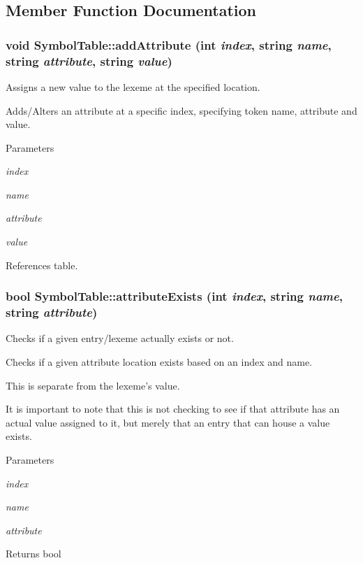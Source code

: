 \subsection{Member Function Documentation}
\hypertarget{classSymbolTable_ac7a86e820025627863b4277cf84353a0}{
\subsubsection[{addAttribute}]{\setlength{\rightskip}{0pt plus 5cm}void SymbolTable::addAttribute (int {\em index}, \/  string {\em name}, \/  string {\em attribute}, \/  string {\em value})}}
\label{classSymbolTable_ac7a86e820025627863b4277cf84353a0}


Assigns a new value to the lexeme at the specified location. 

Adds/Alters an attribute at a specific index, specifying token name, attribute and value.


\begin{DoxyParams}{Parameters}
\item[{\em index}]\item[{\em name}]\item[{\em attribute}]\item[{\em value}]\end{DoxyParams}


References table.

\hypertarget{classSymbolTable_af93b3c97308b5cfe7661e57b83d8dc35}{
\subsubsection[{attributeExists}]{\setlength{\rightskip}{0pt plus 5cm}bool SymbolTable::attributeExists (int {\em index}, \/  string {\em name}, \/  string {\em attribute})}}
\label{classSymbolTable_af93b3c97308b5cfe7661e57b83d8dc35}


Checks if a given entry/lexeme actually exists or not. 

Checks if a given attribute location exists based on an index and name.

This is separate from the lexeme's value.

It is important to note that this is not checking to see if that attribute has an actual value assigned to it, but merely that an entry that can house a value exists. 
\begin{DoxyParams}{Parameters}
\item[{\em index}]\item[{\em name}]\item[{\em attribute}]\end{DoxyParams}
\begin{DoxyReturn}{Returns}
bool 
\end{DoxyReturn}


